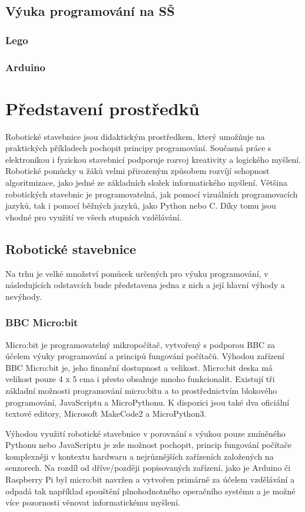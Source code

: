 \documentclass[
  digital,     %
  oneside,     %
  nosansbold,  %
  nocolorbold, %
  lof,         %
  lot,         %
]{fithesis4}
\begin{document}
\section{Výuka programování na SŠ}
    \subsection{Lego}
    \subsection{Arduino}

\chapter{Představení prostředků}
Robotické stavebnice jsou didaktickým prostředkem, který umožňuje na praktických příkladech pochopit principy programování. Současná práce s elektronikou i fyzickou stavebnicí podporuje rozvoj kreativity a logického myšlení. Robotické pomůcky u žáků velmi přirozeným způsobem rozvíjí schopnost algoritmizace, jako jedné ze základních složek informatického myšlení. Většina robotických stavebnic je programovatelná, jak pomocí vizuálních programovacích jazyků, tak i pomocí běžných jazyků, jako Python nebo C. Díky tomu jsou vhodné pro využití ve všech stupních vzdělávání.

\section{Robotické stavebnice}
Na trhu je velké množství pomůcek určených pro výuku programování, v následujících odstavcích bude představena jedna z nich a její hlavní výhody a nevýhody. 

\subsection{BBC Micro:bit}
Micro:bit je programovatelný mikropočítač, vytvořený s podporou BBC za účelem výuky programování a principů fungování počítačů. Výhodou zařízení BBC Micro:bit je, jeho finanční dostupnost a velikost. Micro:bit deska má velikost pouze 4 x 5 cma i přesto obsahuje mnoho funkcionalit. Existují tři základní možnosti programování micro:bitu a to prostřednictvím blokového programování, JavaScriptu a MicroPythonu. K dispozici jsou také dva oficiální textové editory, Microsoft MakeCode2 a MicroPython3.

Výhodou využití robotické stavebnice v porovnání s výukou pouze zmíněného Pythonu nebo JavaScriptu je zde možnost pochopit, princip fungování počítače komplexněji v kontextu hardwaru a nejrůznějších zařízeních založených na senzorech. Na rozdíl od dříve/později popisovaných zařízení, jako je Arduino či Raspberry Pi byl micro:bit navržen a vytvořen primárně za účelem vzdělávání a odpadá tak například spouštění plnohodnotného operačního systému a je možné více pozornosti věnovat informatickému myšlení.
\end{document}
